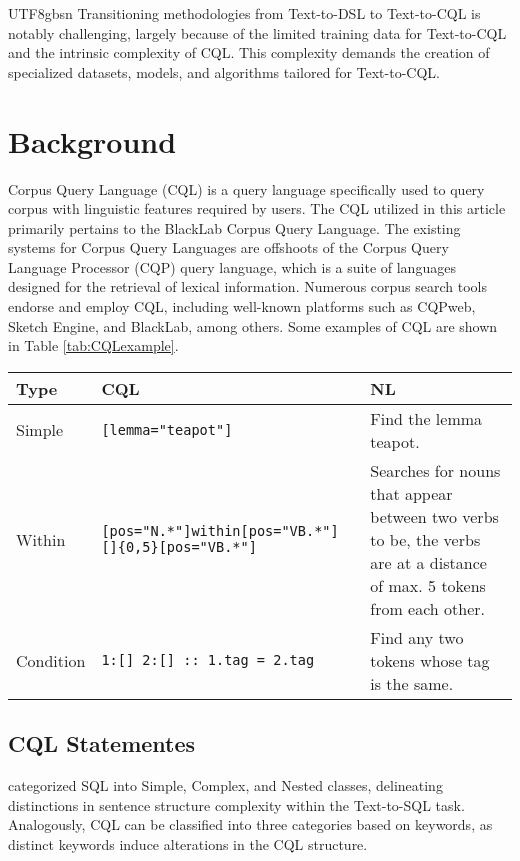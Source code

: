 \documentclass[11pt]{article}
\begin{document}
\begin{CJK*}{UTF8}{gbsn}
Transitioning methodologies from Text-to-DSL to Text-to-CQL is notably challenging, largely because of the limited training data for Text-to-CQL and the intrinsic complexity of CQL. 
This complexity demands the creation of specialized datasets, models, and algorithms tailored for Text-to-CQL.


\section{Background}


 Corpus Query Language (CQL) is a query language specifically used to query corpus with linguistic features required by users. The CQL utilized in this article primarily pertains to the BlackLab Corpus Query Language. The existing systems for Corpus Query Languages are offshoots of the Corpus Query Language Processor (CQP) query language, which is a suite of languages designed for the retrieval of lexical information. Numerous corpus search tools endorse and employ CQL, including well-known platforms such as CQPweb, Sketch Engine, and BlackLab, among others. Some examples of CQL are shown in Table \ref{tab:CQLexample}.



\begin{table*}
    \centering
    \begin{tabular}{p{5em}p{15em}p{15em}} 
    \hline
    \textbf{Type} & \textbf{CQL} &\textbf{NL} \\
    \hline
    Simple & \verb|[lemma="teapot"]| &Find the lemma teapot.\\
    Within & \verb|[pos="N.*"]|\verb|within|\verb|[pos="VB.*"]| \verb|[]|\verb|{0,5}|\verb|[pos="VB.*"]| & Searches for nouns that appear between two verbs to be, the verbs are at a distance of max. 5 tokens from each other.\\
    Condition & \verb|1:[] 2:[] :: 1.tag = 2.tag| & Find any two tokens whose tag is the same.\\
    \hline
    \end{tabular}
    \caption{Example of the Corpus Query Language. The above examples and explanations are all from the Sketch Engine documentation. }
    \label{tab:CQLexample}
\end{table*}

 

\subsection{CQL Statementes}
\citet{pourreza2023dinsql} categorized SQL into Simple, Complex, and Nested classes, delineating distinctions in sentence structure complexity within the Text-to-SQL task. Analogously, CQL can be classified into three categories based on keywords, as distinct keywords induce alterations in the CQL structure.


\end{CJK*}
\end{document}

